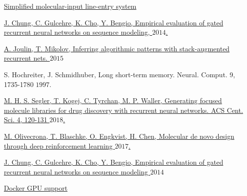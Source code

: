 \documentclass[a4paper]{article}
\begin{document}
\pagebreak
\begin{thebibliography}{1}

\href{https://en.wikipedia.org/wiki/Simplified_molecular-input_line-entry_system/}{Simplified molecular-input line-entry system}

\href{http://arxiv.org/abs/1412.3555/}{J. Chung, C. Gulcehre, K. Cho, Y. Bengio, Empirical evaluation of gated recurrent neural networks on sequence modeling, \(2014\).}

\href{http://arxiv.org/abs/1503.01007}{A. Joulin, T. Mikolov, Inferring algorithmic patterns with stack-augmented recurrent nets. \(2015\)}

{S. Hochreiter, J. Schmidhuber, Long short-term memory. Neural. Comput. 9, 1735-1780 \(1997\).}

\href{https://pubs.acs.org/doi/10.1021/acscentsci.7b00512}{M. H. S. Segler, T. Kogej, C. Tyrchan, M. P. Waller, Generating focused molecule libraries for drug discovery with recurrent neural networks. ACS Cent. Sci. 4, 120-131 \(2018\).}

\href{http://arxiv.org/abs/1704.07555}{M. Olivecrona, T. Blaschke, O. Engkvist, H. Chen, Molecular de novo design through deep reinforcement learning \(2017\).}

\href{http://arxiv.org/abs/1412.3555}{J. Chung, C. Gulcehre, K. Cho, Y. Bengio, Empirical evaluation of gated recurrent neural networks on sequence modeling \(2014\)}

\href{https://docs.docker.com/compose/gpu-support/}{Docker GPU support}

\end{thebibliography}
\end{document}

